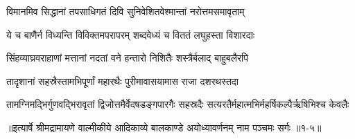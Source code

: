 \twolineshloka
{विमानमिव सिद्धानां तपसाधिगतं दिवि}
{सुनिवेशितवेश्मान्तां नरोत्तमसमावृताम्} %

\twolineshloka
{ये च बाणैर्न विध्यन्ति विविक्तमपरापरम्}
{शब्दवेध्यं च विततं लघुहस्ता विशारदाः} %

\twolineshloka
{सिंहव्याघ्रवराहाणां मत्तानां नदतां वने}
{हन्तारो निशितैः शस्त्रैर्बलाद् बाहुबलैरपि} %

\twolineshloka
{तादृशानां सहस्रैस्तामभिपूर्णां महारथैः}
{पुरीमावासयामास राजा दशरथस्तदा} %

\twolineshloka
{तामग्निमद्भिर्गुणवद्भिरावृतां द्विजोत्तमैर्वेदषडङ्गपारगैः}
{सहस्रदैः सत्यरतैर्महात्मभिर्महर्षिकल्पैर्ऋषिभिश्च केवलैः} %


॥इत्यार्षे श्रीमद्रामायणे वाल्मीकीये आदिकाव्ये बालकाण्डे अयोध्यावर्णनम् नाम पञ्चमः सर्गः ॥१-५॥
